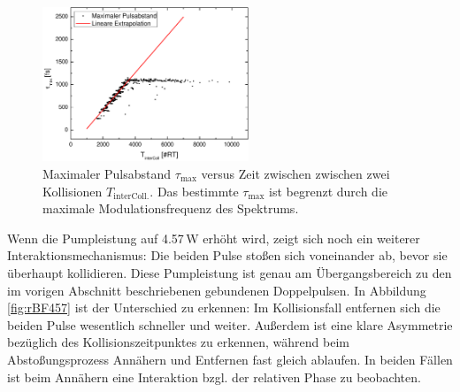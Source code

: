 \documentclass[bachelor,       %
               twoside,        %
               BCOR10mm,       %
               liststotoc,nomtotoc,bibtotoc, %
               english,ngerman, %
               final,          %
               ]{GAUBM}
\begin{document}
\begin{figure}[!htb]
	\centering
	\includegraphics[width=0.55\textwidth]{figures/bounceDistTime}
	\caption{Maximaler Pulsabstand $\tau_\text{max}$ versus Zeit zwischen zwischen zwei Kollisionen $T_\text{interColl.}$. Das bestimmte $\tau_\text{max}$ ist begrenzt durch die maximale Modulationsfrequenz des Spektrums.}
	\label{fig:bounceDistTime}
\end{figure}

Wenn die Pumpleistung auf 4.57\,W erhöht wird, zeigt sich noch ein weiterer Interaktionsmechanismus: Die beiden Pulse stoßen sich voneinander ab, bevor sie überhaupt kollidieren.
Diese Pumpleistung ist genau am Übergangsbereich zu den im vorigen Abschnitt beschriebenen gebundenen Doppelpulsen.
In Abbildung \ref{fig:rBF457} ist der Unterschied zu erkennen: Im Kollisionsfall entfernen sich die beiden Pulse wesentlich schneller und weiter.
Außerdem ist eine klare Asymmetrie bezüglich des Kollisionszeitpunktes zu erkennen, während beim Abstoßungsprozess Annähern und Entfernen fast gleich ablaufen.
In beiden Fällen ist beim Annähern eine Interaktion bzgl. der relativen Phase zu beobachten.
\end{document}
